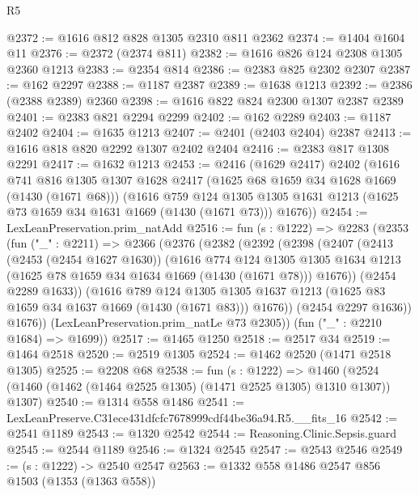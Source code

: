 \begin{lexlean}{R5}
\begin{coremodule}
@2372 := @1616 @812 @828 @1305 @2310 @811 @2362
@2374 := @1404 @1604 @11
@2376 := @2372 (@2374 @811)
@2382 := @1616 @826 @124 @2308 @1305 @2360 @1213
@2383 := @2354 @814
@2386 := @2383 @825 @2302 @2307
@2387 := @162 @2297
@2388 := @1187 @2387
@2389 := @1638 @1213
@2392 := @2386 (@2388 @2389) @2360
@2398 := @1616 @822 @824 @2300 @1307 @2387 @2389
@2401 := @2383 @821 @2294 @2299
@2402 := @162 @2289
@2403 := @1187 @2402
@2404 := @1635 @1213
@2407 := @2401 (@2403 @2404) @2387
@2413 := @1616 @818 @820 @2292 @1307 @2402 @2404
@2416 := @2383 @817 @1308 @2291
@2417 := @1632 @1213
@2453 := @2416
    (@1629 @2417)
    @2402
    (@1616
      @741
      @816
      @1305
      @1307
      @1628
      @2417
      (@1625 @68 @1659 @34 @1628 @1669 (@1430 (@1671 @68)))
      (@1616
        @759
        @124
        @1305
        @1305
        @1631
        @1213
        (@1625 @73 @1659 @34 @1631 @1669 (@1430 (@1671 @73)))
        @1676))
@2454 := LexLeanPreservation.prim_natAdd
@2516 := fun (s : @1222) =>
  @2283
    (@2353
      (fun ("_" : @2211) =>
      @2366
        (@2376
          (@2382
            (@2392
              (@2398
                (@2407
                  (@2413
                    (@2453 (@2454 @1627 @1630))
                    (@1616
                      @774
                      @124
                      @1305
                      @1305
                      @1634
                      @1213
                      (@1625 @78 @1659 @34 @1634 @1669 (@1430 (@1671 @78)))
                      @1676))
                  (@2454 @2289 @1633))
                (@1616
                  @789
                  @124
                  @1305
                  @1305
                  @1637
                  @1213
                  (@1625 @83 @1659 @34 @1637 @1669 (@1430 (@1671 @83)))
                  @1676))
              (@2454 @2297 @1636))
            @1676))
        (LexLeanPreservation.prim_natLe @73 @2305))
      (fun ("_" : @2210 @1684) => @1699))
@2517 := @1465 @1250
@2518 := @2517 @34
@2519 := @1464 @2518
@2520 := @2519 @1305
@2524 := @1462 @2520 (@1471 @2518 @1305)
@2525 := @2208 @68
@2538 := fun (s : @1222) =>
  @1460 (@2524 (@1460 (@1462 (@1464 @2525 @1305) (@1471 @2525 @1305) @1310 @1307)) @1307)
@2540 := @1314 @558 @1486
@2541 := LexLeanPreserve.C31ece431dfcfc7678999cdf44be36a94.R5.__fits_16
@2542 := @2541 @1189
@2543 := @1320 @2542
@2544 := Reasoning.Clinic.Sepsis.guard
@2545 := @2544 @1189
@2546 := @1324 @2545
@2547 := @2543 @2546
@2549 := (s : @1222) -> @2540 @2547
@2563 := @1332
    @558
    @1486
    @2547
    @856
    @1503
    (@1353 (@1363 @558))

\end{coremodule}
\end{lexlean}

